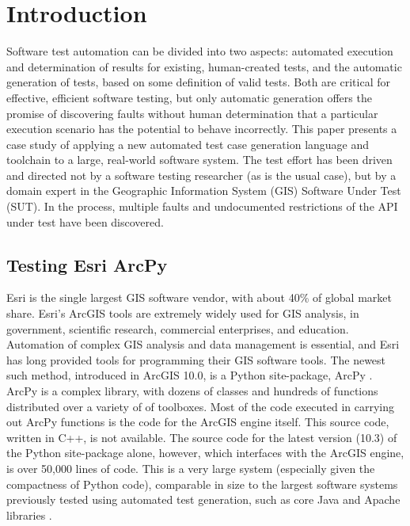 \section{Introduction}

Software test automation can be divided into two aspects:  automated execution
and determination of results for existing, human-created tests, and
the automatic generation of tests, based on some definition of valid
tests.  Both are critical for effective, efficient software testing,
but only automatic generation offers the promise of discovering faults
without human determination that a particular execution scenario has
the potential to behave incorrectly.
This paper presents a case study of applying a new automated test case
generation language and toolchain to a large, real-world software system.
The test effort has been driven and directed not by a software testing
researcher (as is the usual case), but by a domain expert in the
Geographic Information System (GIS)
Software Under Test (SUT).  In the process, multiple faults and
undocumented restrictions of the API under test have been discovered.

\subsection{Testing Esri ArcPy}


Esri is the single largest GIS software vendor, with about 40\% of
global market share.  Esri's ArcGIS tools are extremely widely used
for GIS analysis, in government, scientific research, commercial
enterprises, and education.  Automation of complex GIS analysis and
data management is essential, and Esri has long provided tools for
programming their GIS software tools.  The newest such method,
introduced in ArcGIS 10.0, is a Python site-package, ArcPy
\cite{ArcPy}.  ArcPy is a complex library, with dozens of classes and
hundreds of functions distributed over a variety of of toolboxes.
Most of the code executed in carrying out ArcPy functions is the code
for the ArcGIS engine itself.  This source code, written in C++, is
not available.  The source code for the latest version (10.3) of the
Python site-package alone, however, which interfaces with the ArcGIS
engine, is over 50,000 lines of code.  This is a very large system
(especially given the compactness of Python code), comparable in size
to the largest software systems previously tested using automated test
generation, such as core Java and Apache libraries
\cite{FA11,Pacheco}.

